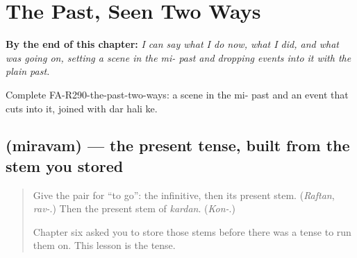 
\chapter{The Past, Seen Two Ways}
\label{ch:fa-the-past-seen-two-ways}

\begin{chapteropening}
\textbf{By the end of this chapter:} \emph{I can say what I do now, what I did, and what was going on, setting a scene in the mi- past and dropping events into it with the plain past.}

Complete FA-R290-the-past-two-ways: a scene in the mi- past and an event that cuts into it, joined with dar hali ke.
\end{chapteropening}

\section[\texorpdfstring{\fa{میروم} (miravam)}{میروم (miravam)}]{ (miravam) — the present tense, built from the stem you stored}

\label{lesson:FA-C290-miravam}



\begin{quote}
Give the pair for \textquotedblleft{}to go\textquotedblright{}: the infinitive, then its present stem. (\emph{Raftan}, \emph{rav-}.) Then the present stem of \emph{kardan}. (\emph{Kon-}.)

Chapter six asked you to store those stems before there was a tense to run them on. This lesson is the tense.
\end{quote}

